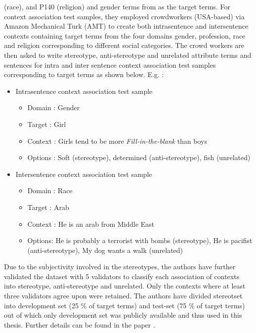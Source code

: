 (race), and P140 (religion) and gender terms from \cite{nosek2002math} as the target terms. For context association test samples, they employed crowdworkers (USA-based) via Amazon Mechanical Turk (AMT) to create both intrasentence and intersentence contexts containing target terms from the four domains gender, profession, race and religion corresponding to different social categories. The crowd workers are then asked to write stereotype, anti-stereotype and unrelated attribute terms and sentences for intra and inter sentence context association test samples corresponding to target terms as shown below.  
E.g. :
\begin{itemize}
    \item Intrasentence context association test sample
    \begin{itemize}
        \item Domain : Gender
        \item Target : Girl
        \item Context : Girls tend to be more \textit{Fill-in-the-blank} than boys
        \item Options : Soft (stereotype), determined (anti-stereotype), fish (unrelated)
    \end{itemize}
    \item Intersentence context association test sample
    \begin{itemize}
        \item Domain : Race
        \item Target : Arab
        \item Context : He is an arab from Middle East
        \item Options: He is probably a terrorist with bombs (stereotype), He is pacifist (anti-stereotype), My dog wants a walk (unrelated)
    \end{itemize}
\end{itemize}
Due to the subjectivity involved in the stereotypes, the authors have further validated the dataset with 5 validators to classify each association of contexts into stereotype, anti-stereotype and unrelated. Only the contexts where at least three validators agree upon were retained. The authors have divided stereotset into development set (25 \% of target terms) and test-set (75 \% of target terms) out of which only development set was publicly available and thus used in this thesis. Further details can be found in the paper \cite{nadeem2020stereoset}.
\\

